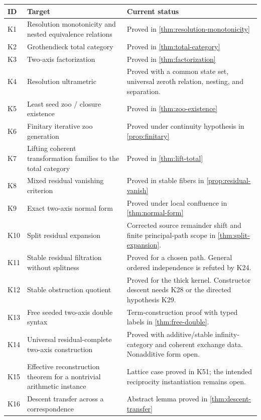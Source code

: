 \documentclass[11pt]{article}
\theoremstyle{definition}
\theoremstyle{remark}
\begin{document}
\begin{longtable}{>{\raggedright\arraybackslash}p{} >{\raggedright\arraybackslash}p{} >{\raggedright\arraybackslash}p{}}
\toprule
ID & Target & Current status\\
\midrule
\endhead
K1 & Resolution monotonicity and nested equivalence relations & Proved in \cref{thm:resolution-monotonicity}\\
K2 & Grothendieck total category & Proved in \cref{thm:total-category}\\
K3 & Two-axis factorization & Proved in \cref{thm:factorization}\\
K4 & Resolution ultrametric & Proved with a common state set, universal zeroth relation, nesting, and separation.\\
K5 & Least seed zoo / closure existence & Proved in \cref{thm:zoo-existence}\\
K6 & Finitary iterative zoo generation & Proved under continuity hypothesis in \cref{prop:finitary}\\
K7 & Lifting coherent transformation families to the total category & Proved in \cref{thm:lift-total}\\
K8 & Mixed residual vanishing criterion & Proved in stable fibers in \cref{prop:residual-vanish}\\
K9 & Exact two-axis normal form & Proved under local confluence in \cref{thm:normal-form}\\
K10 & Split residual expansion & Corrected source remainder shift and finite principal-path scope in \cref{thm:split-expansion}.\\
K11 & Stable residual filtration without splitness & Proved for a chosen path. General ordered independence is refuted by K24.\\
K12 & Stable obstruction quotient & Proved for the thick kernel. Constructor descent needs K28 or the directed hypothesis K29.\\
K13 & Free seeded two-axis double syntax & Term-construction proof with typed labels in \cref{thm:free-double}.\\
K14 & Universal residual-complete two-axis construction & Proved with additive/stable infinity-category and coherent exchange data. Nonadditive form open.\\
K15 & Effective reconstruction theorem for a nontrivial arithmetic instance & Lattice case proved in K51; the intended reciprocity instantiation remains open.\\
K16 & Descent transfer across a correspondence & Abstract lemma proved in \cref{thm:descent-transfer}\\

\end{longtable}
\end{document}

